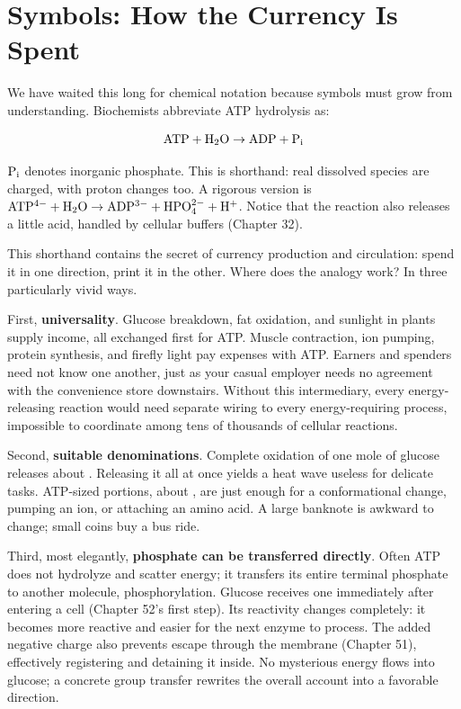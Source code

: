 \section{Symbols: How the Currency Is Spent}

We have waited this long for chemical notation because symbols must grow from understanding. Biochemists abbreviate ATP hydrolysis as:

\[\mathrm{ATP} + \mathrm{H_2O} \rightarrow \mathrm{ADP} + \mathrm{P_i}\]

$\mathrm{P_i}$ denotes inorganic phosphate. This is shorthand: real dissolved species are charged, with proton changes too. A rigorous version is $\mathrm{ATP^{4-}} + \mathrm{H_2O} \rightarrow \mathrm{ADP^{3-}} + \mathrm{HPO_4^{2-}} + \mathrm{H^+}$. Notice that the reaction also releases a little acid, handled by cellular buffers (Chapter 32).

This shorthand contains the secret of currency production and circulation: spend it in one direction, print it in the other. Where does the analogy work? In three particularly vivid ways.

First, \textbf{universality}. Glucose breakdown, fat oxidation, and sunlight in plants supply income, all exchanged first for ATP. Muscle contraction, ion pumping, protein synthesis, and firefly light pay expenses with ATP. Earners and spenders need not know one another, just as your casual employer needs no agreement with the convenience store downstairs. Without this intermediary, every energy-releasing reaction would need separate wiring to every energy-requiring process, impossible to coordinate among tens of thousands of cellular reactions.

Second, \textbf{suitable denominations}. Complete oxidation of one mole of glucose releases about . Releasing it all at once yields a heat wave useless for delicate tasks. ATP-sized portions, about , are just enough for a conformational change, pumping an ion, or attaching an amino acid. A large banknote is awkward to change; small coins buy a bus ride.

Third, most elegantly, \textbf{phosphate can be transferred directly}. Often ATP does not hydrolyze and scatter energy; it transfers its entire terminal phosphate to another molecule, phosphorylation. Glucose receives one immediately after entering a cell (Chapter 52's first step). Its reactivity changes completely: it becomes more reactive and easier for the next enzyme to process. The added negative charge also prevents escape through the membrane (Chapter 51), effectively registering and detaining it inside. No mysterious energy flows into glucose; a concrete group transfer rewrites the overall account into a favorable direction.

